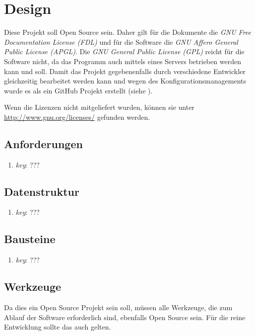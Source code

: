 \documentclass[english,ngerman,parskip=half,headsepline,footsepline]{scrreprt}
\begin{document}
	
	\chapter{Design}
	\thispagestyle{scrheadings}
	
	Diese Projekt soll Open Source sein. Daher gilt für die Dokumente die \emph{GNU Free Documentation License (FDL)} und für die Software die \emph{GNU Affero General Public License (APGL)}. Die \emph{GNU General Public License (GPL)} reicht für die Software nicht, da das Programm auch mittels eines Servers betrieben werden kann und soll. Damit das Projekt gegebenenfalls durch verschiedene Entwickler gleichzeitig bearbeitet werden kann und wegen des Konfigurationsmanagements wurde es als ein GitHub Projekt erstellt (siehe \cite{ASBA}).
	
	Wenn die Lizenzen nicht mitgeliefert wurden, können sie unter \url{http://www.gnu.org/licenses/} gefunden werden.
	
	\section{Anforderungen}
	\begin{enumerate}
		\item\label{Anforderung:key}\emph{key}: ???
	\end{enumerate}
	
	\section{Datenstruktur}
	\begin{enumerate}
		\item\label{Datenstruktur:key}\emph{key}: ???
	\end{enumerate}
	
	\section{Bausteine}
	\begin{enumerate}
		\item\label{Baustein:key}\emph{key}: ???
	\end{enumerate}
	
	\section{Werkzeuge}
	\label{sec:Werkzeuge}
	Da dies ein Open Source Projekt sein soll, müssen alle Werkzeuge, die zum Ablauf der Software erforderlich sind, ebenfalls Open Source sein. Für die reine Entwicklung sollte das auch gelten.
	
\end{document}
